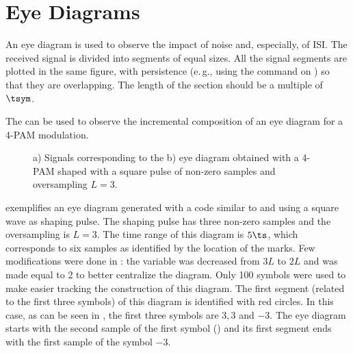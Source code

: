 \section{Eye Diagrams}


An eye diagram is used to observe the impact of noise and, especially, of ISI. The received signal is divided into segments of equal sizes. All the signal segments are plotted in
the same figure, with persistence (e.\,g., using the command  on {\matlab}) so that they are overlapping. The length of the section should be a multiple of $\tsym$. 

The  can be used to observe the incremental composition of an eye diagram for a 4-PAM modulation.



\begin{figure}[htbp]
\centering
  \caption{a) Signals corresponding to the b) eye diagram obtained with a 4-PAM shaped with a square pulse of non-zero samples and oversampling $L=3$.}
  \label{fig:eyeDiagramPulseAll}
\end{figure}

 exemplifies an eye diagram generated with a code similar to  and using a square wave as shaping pulse. The shaping pulse has three non-zero samples and the oversampling is $L=3$. The time range of this diagram is $5 \ts$, which corresponds to six samples as identified by the location of the  marks. Few modifications were done in : the variable  was decreased from $3 L$ to $2L$ and  was made equal to 2 to better centralize the diagram. Only 100 symbols were used to make easier tracking the construction of this diagram.  The first segment (related to the first three symbols) of this diagram is identified with red circles. In this case, as can be seen in , the first three symbols are $3, 3$ and $-3$. The eye diagram starts with the second sample of the first symbol () and its first segment ends with the first sample of the symbol $-3$.

